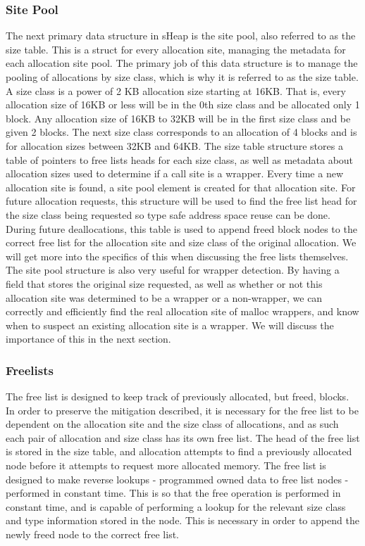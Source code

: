 \documentclass[conference]{IEEEtran}
\begin{document}
\subsubsection{Site Pool}
The next primary data structure in sHeap is the site pool, also referred to as the size table. This is a struct for 
every allocation site, managing the metadata for each allocation site pool. The 
primary job of this data structure is to manage the pooling of allocations by 
size class, which is why it is referred to as the size table. A size class is a power of 2 KB allocation size starting at 16KB. 
That is, every allocation size of 16KB or less will be in the 0th size class 
and be allocated only 1 block. Any allocation size of 16KB to 32KB will be in 
the first size class and be given 2 blocks. The next size class corresponds 
to an allocation of 4 blocks and is for allocation sizes between 32KB and 64KB. 
The size table structure stores a table of pointers to free lists heads for each 
size class, as well as metadata about allocation sizes used to determine if a 
call site is a wrapper. Every time a new allocation site is found, a site pool 
element is created for that allocation site. For future allocation requests, this 
structure will be used to find the free list head for the size class being 
requested so type safe address space reuse can be done. During future deallocations, 
this table is used to append freed block nodes to the correct free list for the 
allocation site and size class of the original allocation. We will get more into 
the specifics of this when discussing the free lists themselves. The site pool 
structure is also very useful for wrapper detection. By having a field that 
stores the original size requested, as well as whether or not this allocation site 
was determined to be a wrapper or a non-wrapper, we can correctly and efficiently 
find the real allocation site of malloc wrappers, and know when to suspect an 
existing allocation site is a wrapper. We will discuss the importance of this in 
the next section.

\subsubsection{Freelists}
The free list is designed to keep track of previously allocated, but freed, blocks. 
In order to preserve the mitigation described, it is necessary for the free list 
to be dependent on the allocation site and the size class of allocations, and as 
such each pair of allocation and size class has its own free list. The head of 
the free list is stored in the size table, and allocation attempts to find a 
previously allocated node before it attempts to request more allocated memory. The 
free list is designed to make reverse lookups - programmed owned data to free list 
nodes - performed in constant time. This is so that the free operation is performed 
in constant time, and is capable of performing a lookup for the relevant size class 
and type information stored in the node. This is necessary in order to append the 
newly freed node to the correct free list.
\end{document}
